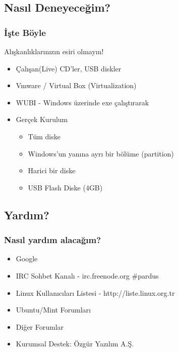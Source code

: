 \documentclass{beamer}
\begin{document}
	\subsection{Nasıl Deneyeceğim?}
	\begin{frame}
		\frametitle{İşte Böyle}
			Alışkanlıklarınızın esiri olmayın!
			\begin{itemize}[<+->]
			\item Çalışan(Live) CD'ler, USB diskler
			\item Vmware / Virtual Box (Virtualization)
			\item WUBI - Windows üzerinde exe çalıştırarak
			\item Gerçek Kurulum
			\begin{itemize}
 				\item Tüm diske
				\item Windows'un yanına ayrı bir bölüme (partition)
				\item Harici bir diske
				\item USB Flash Diske (4GB)
			\end{itemize}

			\end{itemize}
	\end{frame}

	\subsection {Yardım?}
	\begin{frame}
		\frametitle{Nasıl yardım alacağım?}
		\begin{itemize}[<+->]
		 \item \color{brown}Google
		 \item IRC Sohbet Kanalı - irc.freenode.org \#pardus
		 \item \color{black}Linux Kullanıcıları Listesi - http://liste.linux.org.tr
		 \item Ubuntu/Mint Forumları
		 \item Diğer Forumlar
		 \item Kurumsal Destek: Özgür Yazılım A.Ş.
			 
		\end{itemize}

	\end{frame}
	
\end{document}
